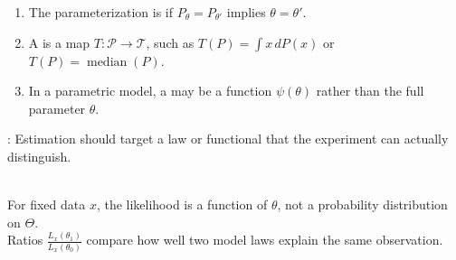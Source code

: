 \begin{definition} \label{def:identifiability-and-parametric-functionals} 
\begin{enumerate}[label=(\roman*)]
\setlength{\itemsep}{0pt}
\item The parameterization is  if $P_\theta=P_{\theta'}$ implies $\theta=\theta'$.
\item A  is a map $T:\mathcal{P}\to\mathcal{T}$, such as $T(P)=\int x\,dP(x)$ or $T(P)=\operatorname{median}(P)$.
\item In a parametric model, a  may be a function $\psi(\theta)$ rather than the full parameter $\theta$.
\end{enumerate}
: Estimation should target a law or functional that the experiment can actually distinguish.
\end{definition}

\begin{remark} \label{rem:likelihood-is-relative-evidence} \\
For fixed data $x$, the likelihood is a function of $\theta$, not a probability distribution on $\Theta$.\\
Ratios $\frac{L_x(\theta_1)}{L_x(\theta_0)}$ compare how well two model laws explain the same observation.
\end{remark}
